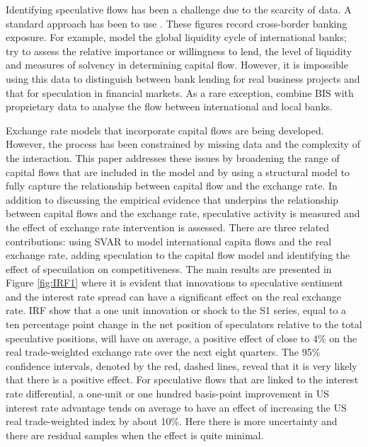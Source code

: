 \documentclass[12pt, a4paper, oneside]{article}\usepackage[]{graphicx}\usepackage[]{color}
\begin{document}
Identifying speculative flows has been a challenge due to the scarcity of data.  A standard approach has been to use \citet{BISbanking}. These figures record cross-border banking exposure.  For example, \citet{Bruno2014} model the global liquidity cycle of international banks; \citet{AdamsKaneGlobal} try to assess the relative importance or willingness to lend, the level of liquidity and measures of solvency in determining capital flow.  However, it is impossible using this data to distinguish between bank lending for real business projects and that for speculation in financial markets.  As a rare exception, \citet{Cerutti2014} combine BIS with proprietary data to analyse the flow between international and local banks. 

Exchange rate models that incorporate capital flows are being developed. However, the process has been constrained by missing data and the complexity of the interaction. This paper addresses these issues by broadening the range of capital flows that are included in the model and by using a structural model to fully capture the relationship between capital flow and the exchange rate. In addition to discussing the empirical evidence that underpins the relationship between capital flows and the exchange rate, speculative activity is measured and the effect of exchange rate intervention is assessed.  There are three related contributions:  using SVAR to model international capita flows and the real exchange rate, adding speculation to the capital flow model and identifying the effect of specuilation on competitiveness.   
 The main results are presented in Figure \ref{fig:IRF1} where it is evident that innovations to speculative sentiment and the interest rate spread can have a significant effect on the real exchange rate.  IRF show that a one unit innovation or shock to the S1 series, equal to a ten percentage point change in the net position of speculators relative to the total speculative positions, will have on average, a positive effect of close to 4\% on the real trade-weighted exchange rate over the next eight quarters.  The 95\% confidence intervals, denoted by the red, dashed lines, reveal that it is very likely that there is a positive effect.  For speculative flows that are linked to the interest rate differential, a one-unit or one hundred basis-point improvement in US interest rate advantage tends on average to have an effect of increasing the US real trade-weighted index by about 10\%.  Here there is more uncertainty and there are residual samples when the effect is quite minimal. 
\end{document}
